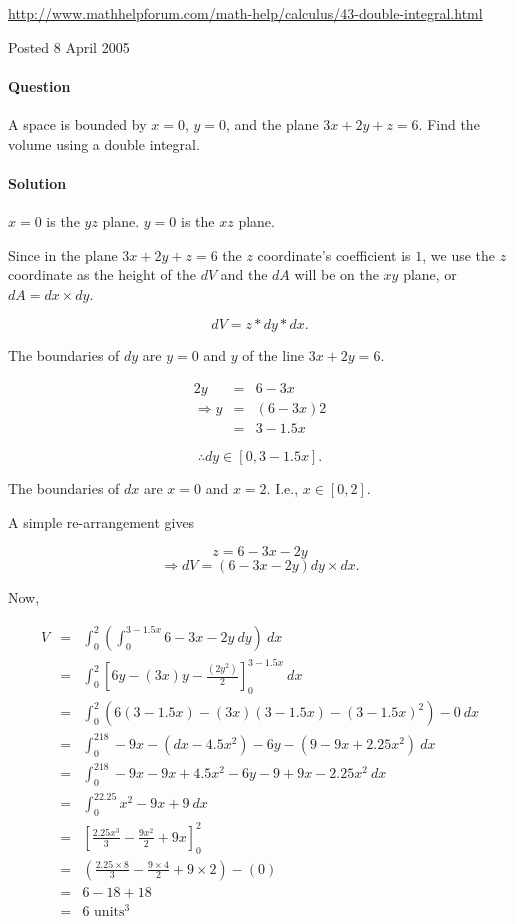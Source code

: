 \url{http://www.mathhelpforum.com/math-help/calculus/43-double-integral.html}

Posted 8 April 2005

\paragraph{Question} A space is bounded by $x=0$, $y=0$, and the plane $3x+2y+z=6$. Find the volume using a double integral.

\paragraph{Solution} 

$x=0$ is the $yz$ plane. $y=0$ is the $xz$ plane.

Since in the plane $3x+2y+z=6$ the $z$ coordinate's coefficient is $1$, we use the $z$ coordinate as the height of the $dV$ and the $dA$ will be on the $xy$ plane, or $dA=dx\times dy$.

\[dV=z*dy*dx.\]

The boundaries of $dy$ are $y=0$ and $y$ of the line $3x+2y=6$.

\begin{eqnarray*}
	2y&=&6-3x\\
	\Rightarrow y&=&\left(6-3x\right)2\\
	&=&3-1.5x
\end{eqnarray*}

\[\therefore dy\in\left[0,3-1.5x\right].\]

The boundaries of $dx$ are $x=0$ and $x=2$. I.e., $x\in\left[0,2\right]$.

A simple re-arrangement gives

\[z=6-3x-2y\]
\[\Rightarrow dV=\left(6-3x-2y\right)dy\times dx.\]

Now,

\begin{eqnarray*}
	V&=&\int_0^2\left(\int_0^{3-1.5x}6-3x-2y~dy\right)~dx\\
	&=&\int_0^2\left[6y-\left(3x\right)y-\frac{\left(2y^2\right)}{2}\right]_0^{3-1.5x}~dx\\
	&=&\int_0^2\left(6\left(3-1.5x\right)-\left(3x\right)\left(3-1.5x\right)-\left(3-1.5x\right)^2\right)-0~dx\\
	&=&\int_0^218-9x-\left(dx-4.5x^2\right)-6y-\left(9-9x+2.25x^2\right)~dx\\
	&=&\int_0^218-9x-9x+4.5x^2-6y-9+9x-2.25x^2~dx\\
	&=&\int_0^22.25x^2-9x+9~dx\\
	&=&\left[\frac{2.25x^3}{3}-\frac{9x^2}{2}+9x\right]_0^2\\
	&=&\left(\frac{2.25\times8}{3}-\frac{9\times4}{2}+9\times2\right)-\left(0\right)\\
	&=&6-18+18\\
	&=&6\mbox{ units}^3
\end{eqnarray*}

